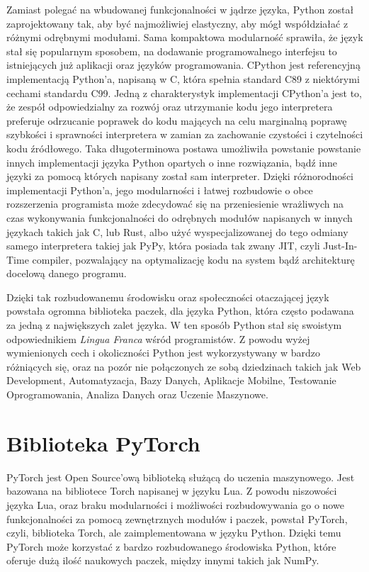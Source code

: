 Zamiast polegać na wbudowanej funkcjonalności w jądrze języka, Python został zaprojektowany tak, aby być najmożliwiej elastyczny, aby mógł współdziałać z różnymi odrębnymi modułami. Sama kompaktowa modularność sprawiła, że język stał się popularnym sposobem, na dodawanie programowalnego interfejsu to istniejących już aplikacji oraz języków programowania.
CPython jest referencyjną implementacją Python'a, napisaną w C, która spełnia standard C89 z niektórymi cechami standardu C99. Jedną z charakterystyk implementacji CPython'a jest to, że zespół odpowiedzialny za rozwój oraz utrzymanie kodu jego interpretera preferuje odrzucanie poprawek do kodu mających na celu marginalną poprawę szybkości i sprawności interpretera w zamian za zachowanie czystości i czytelności kodu źródłowego. Taka długoterminowa postawa umożliwiła powstanie powstanie innych implementacji języka Python opartych o inne rozwiązania, bądź inne języki za pomocą których napisany został sam interpreter. Dzięki różnorodności implementacji Python'a, jego modularności i łatwej rozbudowie o obce rozszerzenia programista może zdecydować się na przeniesienie wrażliwych na czas wykonywania funkcjonalności do odrębnych modułów napisanych w innych językach takich jak C, lub Rust, albo użyć wyspecjalizowanej do tego odmiany samego interpretera takiej jak PyPy, która posiada tak zwany JIT, czyli Just-In-Time compiler, pozwalający na optymalizację kodu na system bądź architekturę docelową danego programu.

Dzięki tak rozbudowanemu środowisku oraz społeczności otaczającej język powstała ogromna biblioteka paczek, dla języka Python, która często podawana za jedną z największych zalet języka. W ten sposób Python stał się swoistym odpowiednikiem \textit{Lingua Franca} wśród programistów. Z powodu wyżej wymienionych cech i okoliczności Python jest wykorzystywany w bardzo różniących się, oraz na pozór nie połączonych ze sobą dziedzinach takich jak Web Development, Automatyzacja, Bazy Danych, Aplikacje Mobilne, Testowanie Oprogramowania, Analiza Danych oraz Uczenie Maszynowe.



\section{Biblioteka PyTorch}
\label{section:pytorch}
PyTorch \cite{PyTorchWebSite} \cite{DeepLearningWithPyTorch} \cite{ProgrammingPyTorchForDeepLearning} \cite{PyTorchPocketReference} jest Open Source'ową biblioteką służącą do uczenia maszynowego. Jest bazowana na bibliotece Torch napisanej w języku Lua. Z powodu niszowości języka Lua, oraz braku modularności i możliwości rozbudowywania go o nowe funkcjonalności za pomocą zewnętrznych modułów i paczek, powstał PyTorch, czyli, biblioteka Torch, ale zaimplementowana w języku Python. Dzięki temu PyTorch może korzystać z bardzo rozbudowanego środowiska Python, które oferuje dużą ilość naukowych paczek, między innymi takich jak NumPy.


